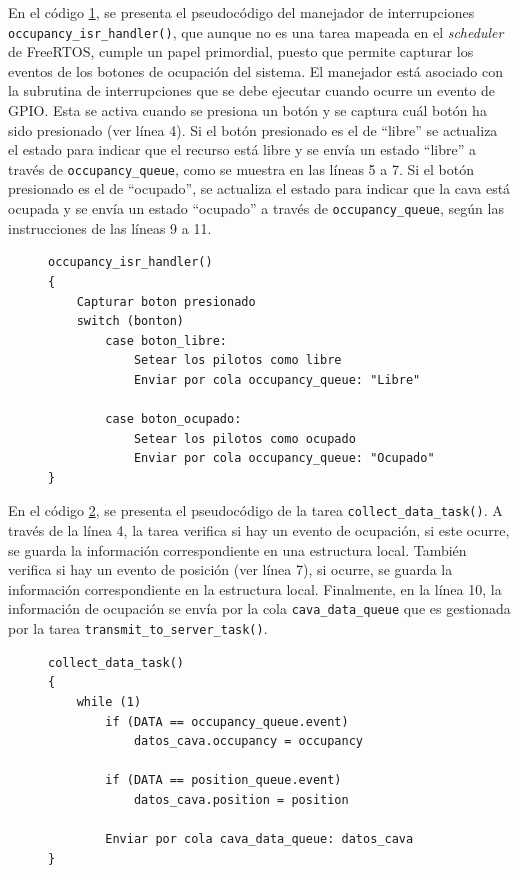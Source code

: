 En el código \ref{cod:occupancy_isr_handler}, se presenta el pseudocódigo del manejador de interrupciones \verb|occupancy_isr_handler()|, que aunque no es una tarea mapeada en el \textit{scheduler} de FreeRTOS, cumple un papel primordial, puesto que permite capturar los eventos de los botones de ocupación del sistema. El manejador está asociado con la subrutina de interrupciones que se debe ejecutar cuando ocurre un evento de GPIO. Esta se activa cuando se presiona un botón y se captura cuál botón ha sido presionado (ver línea 4). Si el botón presionado es el de ``libre'' se actualiza el estado para indicar que el recurso está libre y se envía un estado ``libre'' a través de \verb|occupancy_queue|, como se muestra en las líneas 5 a 7. Si el botón presionado es el de ``ocupado'', se actualiza el estado para indicar que la cava está ocupada y se envía un estado ``ocupado'' a través de \verb|occupancy_queue|, según las instrucciones de las líneas 9 a 11.


\begin{figure}[H]
\begin{lstlisting}
occupancy_isr_handler()
{
	Capturar boton presionado
	switch (bonton)
		case boton_libre: 
			Setear los pilotos como libre
			Enviar por cola occupancy_queue: "Libre"
		
		case boton_ocupado:
			Setear los pilotos como ocupado
			Enviar por cola occupancy_queue: "Ocupado"	
}

\end{lstlisting}
\label{cod:occupancy_isr_handler}
\end{figure}


En el código \ref{cod:collect_data_task}, se presenta el pseudocódigo de la tarea \verb|collect_data_task()|. A través de la línea 4, la tarea verifica si hay un evento de ocupación, si este ocurre, se guarda la información correspondiente en una estructura local. También verifica si hay un evento de posición (ver línea 7), si ocurre, se guarda la información correspondiente en la estructura local. Finalmente, en la línea 10, la información de ocupación se envía por la cola \verb|cava_data_queue| que es gestionada por la tarea \verb|transmit_to_server_task()|.


\begin{figure}[H]
\begin{lstlisting}
collect_data_task()
{
	while (1)
		if (DATA == occupancy_queue.event)
			datos_cava.occupancy = occupancy
			
		if (DATA == position_queue.event)
			datos_cava.position = position
		
		Enviar por cola cava_data_queue: datos_cava		
}

\end{lstlisting}
\label{cod:collect_data_task}
\end{figure}



